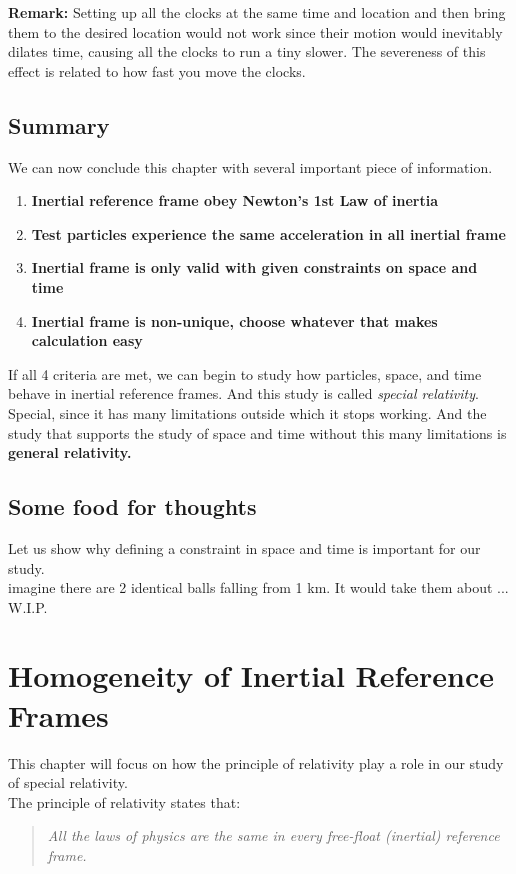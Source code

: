 \documentclass[11pt,letterpaper]{book}
\begin{document}
\textbf{Remark:} Setting up all the clocks at the same time and location and then bring them to the desired location would not work since their motion would inevitably dilates time, causing all the clocks to run a tiny slower. The severeness of this effect is related to how fast you move the clocks. 

\subsection{Summary}
We can now conclude this chapter with several important piece of information.
\begin{enumerate}
    \item \textbf{Inertial reference frame obey Newton's 1st Law of inertia}
    \item \textbf{Test particles experience the same acceleration in all inertial frame}
    \item \textbf{Inertial frame is only valid with given constraints on space and time}
    \item \textbf{Inertial frame is non-unique, choose whatever that makes calculation easy}
\end{enumerate}
If all 4 criteria are met, we can begin to study how particles, space, and time behave in inertial reference frames. And this study is called \textit{special relativity}. Special, since it has many limitations outside which it stops working. And the study that supports the study of space and time without this many limitations is \textbf{general relativity.}

\subsection{Some food for thoughts}
Let us show why defining a constraint in space and time is important for our study.\\

imagine there are 2 identical balls falling from 1 km. It would take them about ... W.I.P.

\section{Homogeneity of Inertial Reference Frames}
This chapter will focus on how the principle of relativity play a role in our study of special relativity.\\

The principle of relativity states that:
\begin{quote}
    \textit{All the laws of physics are the same in every free-float (inertial) reference frame.}
\end{quote}
\end{document}
